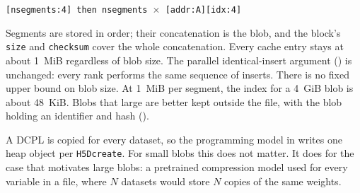 \documentclass[../RFC-HDFG-2026-003.tex]{subfiles}
\begin{document}
\begin{center}
\texttt{[nsegments:4] then nsegments $\times$ [addr:A][idx:4]}
\end{center}

\noindent Segments are stored in order; their concatenation is the blob,
and the block's \texttt{size} and \texttt{checksum} cover the whole
concatenation.  Every cache entry stays at about 1~MiB regardless of blob
size.  The parallel identical-insert argument ()
is unchanged: every rank performs the same sequence of inserts.  There is
no fixed upper bound on blob size.  At 1~MiB per segment, the index for a
4~GiB blob is about 48~KiB.  Blobs that large are better kept outside the
file, with the blob holding an identifier and hash
().

\label{sec:blob-sharing}

A DCPL is copied for every dataset, so the programming model in
 writes one heap object per
\texttt{H5Dcreate}.  For small blobs this does not matter.  It does for
the case that motivates large blobs: a pretrained compression model used
for every variable in a file, where $N$ datasets would store $N$ copies of
the same weights.
\end{document}
